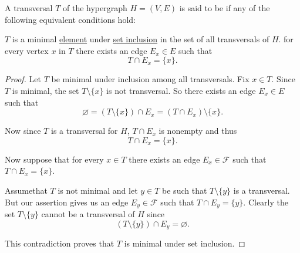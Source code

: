 \begin{definition}\label{def:minimal_hypergraph_transversal}
  A transversal \( T \) of the hypergraph \( H = (V, E) \) is said to be  if any of the following equivalent conditions hold:
  \begin{defenum}
     \( T \) is a minimal \hyperref[def:preordered_set/maximal_minimal_element]{element} under \hyperref[rem:subset_and_membership_relations]{set inclusion} in the set of all transversals of \( H \).
     for every vertex \( x \) in \( T \) there exists an edge \( E_x \in E \) such that
    \begin{equation*}
      T \cap E_x = \{ x \}.
    \end{equation*}
  \end{defenum}
\end{definition}
\begin{proof}
   Let \( T \) be minimal under inclusion among all transversals. Fix \( x \in T \). Since \( T \) is minimal, the set \( T \setminus \{ x \} \) is not transversal. So there exists an edge \( E_x \in E \) such that
  \begin{equation*}
    \varnothing = (T \setminus \{ x \}) \cap E_x = (T \cap E_x) \setminus \{ x \}.
  \end{equation*}

  Now since \( T \) is a transversal for \( H \), \( T \cap E_x \) is nonempty and thus
  \begin{equation*}
    T \cap E_x = \{ x \}.
  \end{equation*}

   Now suppose that for every \( x \in T \) there exists an edge \( E_x \in \mathcal{F} \) such that \( T \cap E_x = \{ x \} \).

  Assume\LEM that \( T \) is not minimal and let \( y \in T \) be such that \( T \setminus \{ y \} \) is a transversal. But our assertion gives us an edge \( E_y \in \mathcal{F} \) such that \( T \cap E_y = \{ y \} \). Clearly the set \( T \setminus \{ y \} \) cannot be a transversal of \( H \) since
  \begin{equation*}
    (T \setminus \{ y \}) \cap E_y = \varnothing.
  \end{equation*}

  This contradiction proves that \( T \) is minimal under set inclusion.
\end{proof}

